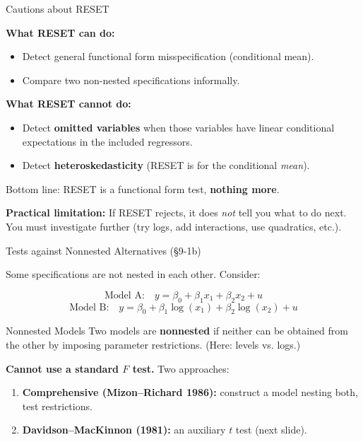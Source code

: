 \documentclass[aspectratio=169, 12pt]{beamer}
\begin{document}
\begin{frame}{Cautions about RESET}

  \begin{keybox}
    \textbf{What RESET can do:}
    \begin{itemize}\setlength{\itemsep}{1pt}
      \item Detect general functional form misspecification (conditional mean).
      \item Compare two non-nested specifications informally.
    \end{itemize}
  \end{keybox}

  \begin{highlightbox}
    \textbf{What RESET cannot do:}
    \begin{itemize}\setlength{\itemsep}{1pt}
      \item Detect \textbf{omitted variables} when those variables have linear conditional
      expectations in the included regressors.
      \item Detect \textbf{heteroskedasticity} (RESET is for the conditional \emph{mean}).
    \end{itemize}
    Bottom line: RESET is a functional form test, \textbf{nothing more}.
  \end{highlightbox}

  \textbf{Practical limitation:} If RESET rejects, it does \emph{not} tell you what to do next.
  You must investigate further (try logs, add interactions, use quadratics, etc.).

\end{frame}

\begin{frame}{Tests against Nonnested Alternatives (\S9-1b)}

  Some specifications are not nested in each other. Consider:

  \[
    \text{Model A:}\quad y = \beta_0 + \beta_1 x_1 + \beta_2 x_2 + u
    \tag{9.6}
  \]
  \[
    \text{Model B:}\quad y = \beta_0 + \beta_1 \log(x_1) + \beta_2 \log(x_2) + u
    \tag{9.7}
  \]

  \begin{definitionbox}{Nonnested Models}
    Two models are \textbf{nonnested} if neither can be obtained from the other by imposing
    parameter restrictions. (Here: levels vs. logs.)
  \end{definitionbox}

  \textbf{Cannot use a standard $F$ test.} Two approaches:
  \begin{enumerate}\setlength{\itemsep}{1pt}
    \item \textbf{Comprehensive (Mizon--Richard 1986):} construct a model nesting both, test restrictions.
    \item \textbf{Davidson--MacKinnon (1981):} an auxiliary $t$ test (next slide).
  \end{enumerate}

\end{frame}
\end{document}
